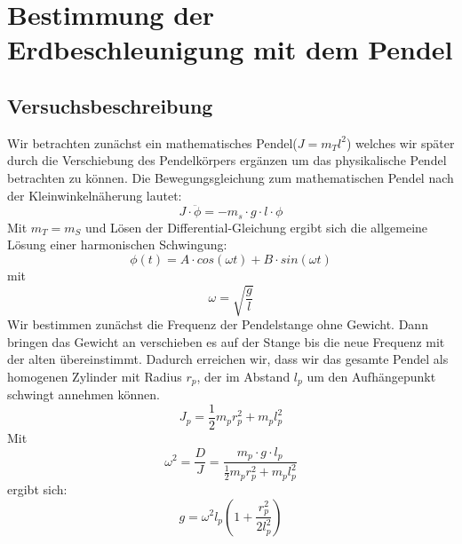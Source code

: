 \documentclass[12pt,a4paper]{article}
\author{Gruppe C14 \\ Julián Häck, Martin Koytek, Lars Wenning, Erik Zimmermann}
\begin{document}
\section{Bestimmung der Erdbeschleunigung mit dem Pendel}
\subsection{Versuchsbeschreibung}
Wir betrachten zunächst ein mathematisches Pendel($J=m_Tl^2$) welches wir später durch die Verschiebung des Pendelkörpers ergänzen um das physikalische Pendel betrachten zu können.
Die Bewegungsgleichung zum mathematischen Pendel nach der Kleinwinkelnäherung lautet:
\begin{equation}
J \cdot \ddot{\phi} = -m_s \cdot g \cdot l \cdot \phi 
\end{equation}
Mit $m_T=m_S$ und Lösen der Differential-Gleichung ergibt sich die allgemeine Lösung einer harmonischen Schwingung:
\begin{equation}
\phi(t)=A\cdot cos(\omega t) + B \cdot sin(\omega t)
\end{equation}
mit 
\begin{equation}
\omega=\sqrt{\frac{g}{l}}
\end{equation}
Wir bestimmen zunächst die Frequenz der Pendelstange ohne Gewicht. Dann bringen das Gewicht an verschieben es auf der Stange bis die neue Frequenz mit der alten übereinstimmt. Dadurch erreichen wir, dass wir das gesamte Pendel als homogenen Zylinder mit Radius $r_p$, der im Abstand $l_p$ um den Aufhängepunkt schwingt annehmen können. 
\begin{equation}
J_p=\frac{1}{2}m_p r_p^2+m_p l_p^2
\end{equation}
Mit
\begin{equation}
\omega^2=\frac{D}{J}=\frac{m_p \cdot g \cdot l_p}{\frac{1}{2}m_p r_p^2+m_pl_p^2}
\end{equation}
ergibt sich:
\begin{equation}
g=\omega^2 l_p (1+\frac{r_p^2}{2 l_p^2}) 
\label{g}
\end{equation} 
\newpage
\end{document}
